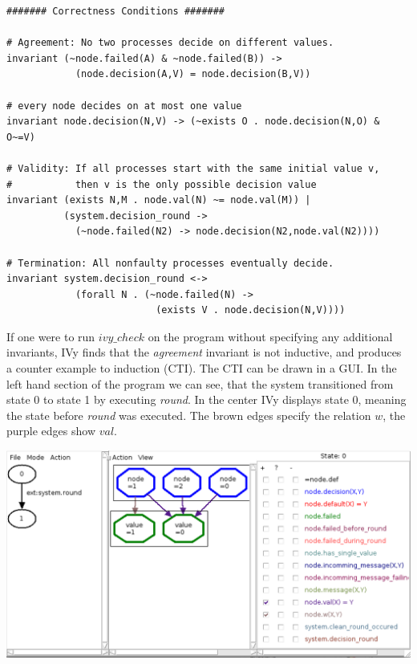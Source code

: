 \documentclass[fleqn]{article}
\begin{document}
\begin{mdframed}[backgroundcolor=light-gray, roundcorner=10pt,leftmargin=1, rightmargin=1, innerleftmargin=15, innertopmargin=15,innerbottommargin=15, outerlinewidth=1, linecolor=light-gray]
\begin{lstlisting}
####### Correctness Conditions #######

# Agreement: No two processes decide on different values.
invariant (~node.failed(A) & ~node.failed(B)) ->
            (node.decision(A,V) = node.decision(B,V))

# every node decides on at most one value
invariant node.decision(N,V) -> (~exists O . node.decision(N,O) & O~=V)

# Validity: If all processes start with the same initial value v,
#           then v is the only possible decision value
invariant (exists N,M . node.val(N) ~= node.val(M)) |
          (system.decision_round ->
            (~node.failed(N2) -> node.decision(N2,node.val(N2))))

# Termination: All nonfaulty processes eventually decide.
invariant system.decision_round <->
            (forall N . (~node.failed(N) ->
                          (exists V . node.decision(N,V))))
\end{lstlisting}
\end{mdframed}

If one were to run $ivy\_check$ on the program without specifying any
additional invariants, IVy finds that the \textit{agreement} invariant is not inductive,
and produces a counter example to induction (CTI). The CTI can be drawn in a GUI.
In the left hand section of the program we can see, that the system transitioned from state 0
to state 1 by executing \textit{round}. In the center IVy displays state 0, meaning the state
before \textit{round} was executed. The brown edges specify the relation $w$, the purple edges
show $val$.

\noindent\includegraphics[width=\textwidth]{gui.png}
\end{document}
